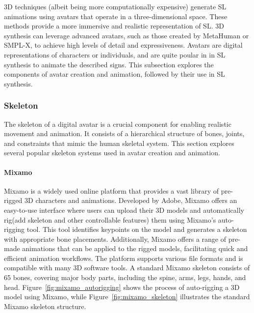 \documentclass[../../main.tex]{subfiles}
\begin{document}
3D techniques (albeit being more computationally expensive) generate SL animations using avatars that operate in a three-dimensional space. These methods provide a more immersive and realistic representation of SL. 3D synthesis can leverage advanced avatars, such as those created by MetaHuman or SMPL-X, to achieve high levels of detail and expressiveness. Avatars are digital representations of characters or individuals, and are quite poular in in SL synthesis to animate the described signs. This subsection explores the components of avatar creation and animation, followed by their use in SL synthesis.

\subsubsection{Skeleton}
\label{ch:background_work:sign_language_synthesis:3d_techniques:skeleton}

The skeleton of a digital avatar is a crucial component for enabling realistic movement and animation. It consists of a hierarchical structure of bones, joints, and constraints that mimic the human skeletal system. This section explores several popular skeleton systems used in avatar creation and animation.

\paragraph{Mixamo}
\label{ch:background_work:sign_language_synthesis:3d_techniques:skeleton:mixamo}

Mixamo is a widely used online platform that provides a vast library of pre-rigged 3D characters and animations. Developed by Adobe, Mixamo offers an easy-to-use interface where users can upload their 3D models and automatically rig(add skeleton and other controllable features) them using Mixamo's auto-rigging tool. This tool identifies keypoints on the model and generates a skeleton with appropriate bone placements. Additionally, Mixamo offers a range of pre-made animations that can be applied to the rigged models, facilitating quick and efficient animation workflows. The platform supports various file formats and is compatible with many 3D software tools. A standard Mixamo skeleton consists of 65 bones, covering major body parts, including the spine, arms, legs, hands, and head. Figure~\ref{fig:mixamo_autorigging} shows the process of auto-rigging a 3D model using Mixamo, while Figure~\ref{fig:mixamo_skeleton} illustrates the standard Mixamo skeleton structure.
\end{document}

